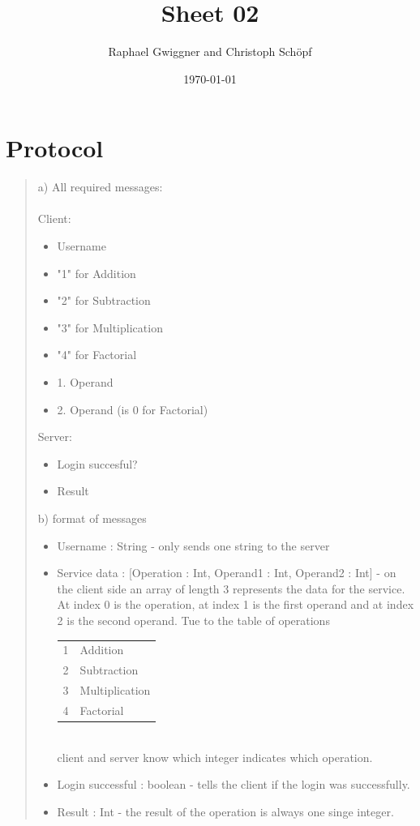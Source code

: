 \documentclass[10pt]{ps-exercise}
\author{Raphael Gwiggner and Christoph Sch\"opf}
\date{\today}
\title{Sheet 02}
\begin{document}
\section{Protocol}
\begin{quote}
a) All required messages: \\ \\
Client:
\begin{itemize}
\item Username
\item "1" for Addition
\item "2" for Subtraction
\item "3" for Multiplication
\item "4" for Factorial
\item 1. Operand
\item 2. Operand (is 0 for Factorial)
\end{itemize}
Server:
\begin{itemize}
\item Login succesful?
\item Result
\end{itemize}
b) format of messages
\begin{itemize}
	\item Username : String - only sends one string to the server
	\item Service data : [Operation : Int, Operand1 : Int, Operand2 : Int] - on the client side an array of length 3 represents the data for the service. At index 0 is the operation, at index 1 is the first operand and at index 2 is the second operand. Tue to the table of operations \\
	\begin{tabular}{l | l}
	1 & Addition \\
	2 & Subtraction \\
	3 & Multiplication \\
	4 & Factorial
	\end{tabular}\\
	client and server know which integer indicates which operation. 

\item Login successful : boolean - tells the client if the login was successfully. 
\item Result : Int - the result of the operation is always one singe integer. 
\end{itemize}
\end{quote}
\end{document}
